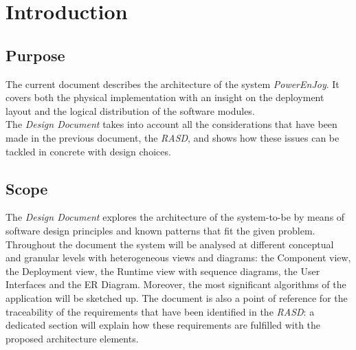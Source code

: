 \documentclass[11pt,a4paper]{report}
\begin{document}


\thispagestyle{empty}
\tableofcontents
\listoffigures
\cleardoublepage
{}
\pagestyle{fancy}
\chapter{Introduction}
\section{Purpose}
The current document describes the architecture of the system \textit{PowerEnJoy}. It covers both the physical implementation with an insight on the deployment layout and the logical distribution of the software modules.\\The \textit{Design Document} takes into account all the considerations that have been made in the previous document, the \textit{RASD}, and shows how these issues can be tackled in concrete with design choices. 

\section{Scope}
The \textit{Design Document} explores the architecture of the system-to-be by means of software design principles and known patterns that fit the given problem. Throughout the document the system will be analysed at different conceptual and granular levels with heterogeneous views and diagrams: the Component view, the Deployment view, the Runtime view with sequence diagrams, the User Interfaces and the ER Diagram. Moreover, the most significant algorithms of the application will be sketched up. The document is also a point of reference for the traceability of the requirements that have been identified in the \textit{RASD}: a dedicated section will explain how these requirements are fulfilled with the proposed architecture elements.
\end{document}
